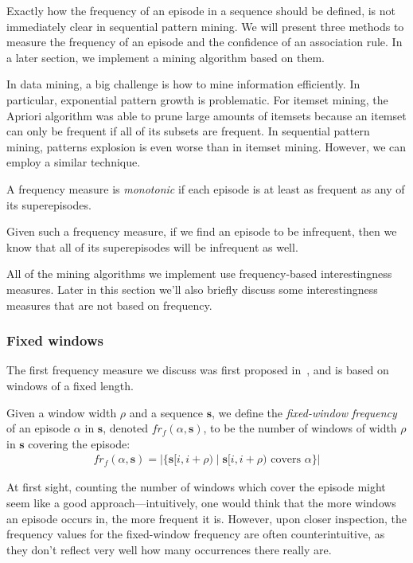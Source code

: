 Exactly how the frequency of an episode in a sequence should be defined, is not immediately clear in sequential pattern mining. We will present three methods to measure the frequency of an episode and the confidence of an association rule. In a later section, we implement a mining algorithm based on them.

In data mining, a big challenge is how to mine information efficiently. In particular, exponential pattern growth is problematic. For itemset mining, the Apriori algorithm \cite{apriori97} was able to prune large amounts of itemsets because an itemset can only be frequent if all of its subsets are frequent. In sequential pattern mining, patterns explosion is even worse than in itemset mining. However, we can employ a similar technique.

\begin{definition}
A frequency measure is \emph{monotonic} if each episode is at least as frequent as any of its superepisodes.
\end{definition}

Given such a frequency measure, if we find an episode to be infrequent, then we know that all of its superepisodes will be infrequent as well.

All of the mining algorithms we implement use frequency-based interestingness measures. Later in this section we'll also briefly discuss some interestingness measures that are not based on frequency.

\subsubsection{Fixed windows}

The first frequency measure we discuss was first proposed in~\cite{winepi97}, and is based on windows of a fixed length.

\begin{definition}
Given a window width $ \rho $ and a sequence $ \boldsymbol{s} $, we define the \emph{fixed-window frequency} of an episode $ \alpha $ in $ \boldsymbol{s} $, denoted $ fr_f(\alpha, \boldsymbol{s}) $, to be the number of windows of width $ \rho $ in $ \boldsymbol{s} $ covering the episode:
\begin{align*}
fr_f(\alpha, \boldsymbol{s}) = | \{ \boldsymbol{s}[i, i + \rho) \mid \boldsymbol{s}[i, i + \rho) \text{ covers } \alpha \} |
\end{align*}
\end{definition}

At first sight, counting the number of windows which cover the episode might seem like a good approach---intuitively, one would think that the more windows an episode occurs in, the more frequent it is. However, upon closer inspection, the frequency values for the fixed-window frequency are often counterintuitive, as they don't reflect very well how many occurrences there really are.

